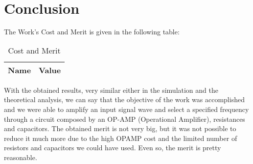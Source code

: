 \section{Conclusion}
\label{sec:conclusion}

The Work's Cost and Merit is given in the following table:

\begin{table}[H]
\centering
\begin{tabular}{|l|l|}
\hline
{\bf Name} & {\bf Value} \\ \hline
    
\end{tabular}
\caption{Cost and Merit}
\end{table}

With the obtained results, very similar either in the simulation and the theoretical analysis, we can say that the objective of the work was accomplished and we were able to amplify an input signal wave and select a specified frequency through a circuit composed by an OP-AMP (Operational Amplifier), resistances and capacitors. The obtained merit is not very big, but it was not possible to reduce it much more due to the high OPAMP cost and the limited number of resistors and capacitors we could have used. Even so, the merit is pretty reasonable.
